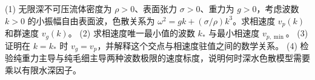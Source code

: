 (1) 无限深不可压流体密度为 \(\rho>0\)、表面张力 \(\sigma>0\)、重力为 \(g>0\)，考虑波数 \(k>0\) 的小振幅自由表面波，色散关系为 \(\omega^2=gk+(\sigma/\rho)k^3\)。求相速度 \(v_p(k)\) 和群速度 \(v_g(k)\)。
(2) 求相速度唯一最小值的波数 \(k_*\) 与最小相速度 \(v_{p,\min}\)。
(3) 证明在 \(k=k_*\) 时 \(v_g=v_p\)，并解释这个交点与相速度驻值之间的数学关系。
(4) 检验纯重力主导与纯毛细主导两种波数极限的速度标度，说明何时深水色散模型需要乘以有限水深因子。
